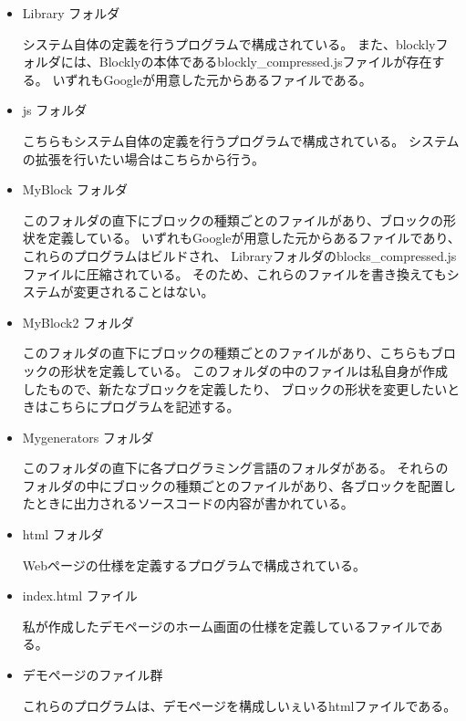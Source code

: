 \documentclass{eniepaper}
\begin{document}
\begin{itemize}

\item Library フォルダ

システム自体の定義を行うプログラムで構成されている。
また、blocklyフォルダには、Blocklyの本体であるblockly\_compressed.jsファイルが存在する。
いずれもGoogleが用意した元からあるファイルである。

\item js フォルダ

こちらもシステム自体の定義を行うプログラムで構成されている。
システムの拡張を行いたい場合はこちらから行う。

\item MyBlock フォルダ

このフォルダの直下にブロックの種類ごとのファイルがあり、ブロックの形状を定義している。
いずれもGoogleが用意した元からあるファイルであり、これらのプログラムはビルドされ、
Libraryフォルダのblocks\_compressed.jsファイルに圧縮されている。
そのため、これらのファイルを書き換えてもシステムが変更されることはない。

\item MyBlock2 フォルダ

このフォルダの直下にブロックの種類ごとのファイルがあり、こちらもブロックの形状を定義している。
このフォルダの中のファイルは私自身が作成したもので、新たなブロックを定義したり、
ブロックの形状を変更したいときはこちらにプログラムを記述する。

  \newpage

\item Mygenerators フォルダ

このフォルダの直下に各プログラミング言語のフォルダがある。
それらのフォルダの中にブロックの種類ごとのファイルがあり、各ブロックを配置したときに出力されるソースコードの内容が書かれている。

\item html フォルダ

Webページの仕様を定義するプログラムで構成されている。

\item index.html ファイル

私が作成したデモページのホーム画面の仕様を定義しているファイルである。



\item デモページのファイル群


これらのプログラムは、デモページを構成しいぇいるhtmlファイルである。

\end{itemize} 
   
\end{document}
